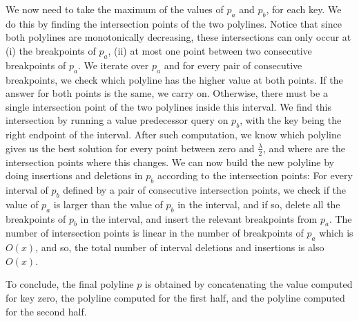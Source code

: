 \documentclass[a4paper,UKenglish]{lipics-v2016}
\theoremstyle{plain}
\begin{document}
We now need to take the maximum of the values of $p_a$ and $p_b$, for each key. We do this by finding the intersection points of the two polylines. Notice that since both polylines are monotonically decreasing, these intersections can only occur at (i) the breakpoints of $p_a$, (ii) at most one point between two consecutive breakpoints of $p_a$. We iterate over $p_a$ and for every pair of consecutive breakpoints, we check which polyline has the higher value at both points. If the answer for both points is the same, we carry on. Otherwise, there must be a single intersection point of the two polylines inside this interval. We find this intersection by running a value predecessor query on $p_b$, with the key being the right endpoint of the interval. After such computation, we know which polyline gives us the best solution for every point between zero and $\frac{\lambda}{2}$, and where are the intersection points where this changes. We can now build the new polyline by doing insertions and deletions in $p_b$ according to the intersection points: For every interval of $p_b$ defined by a pair of consecutive intersection points, we check if the value of $p_a$ is larger than the value of $p_b$ in the interval, and if so, delete all the breakpoints of $p_b$ in the interval, and insert the relevant breakpoints from $p_a$. The number of intersection points is linear in the number of breakpoints of $p_a$ which is $O(x)$, and so, the total number of interval deletions and insertions is also $O(x)$.

To conclude, the final polyline $p$ is obtained by concatenating the value computed for key zero, the polyline computed for the first half, and the polyline computed for the second half. 
\end{document}
